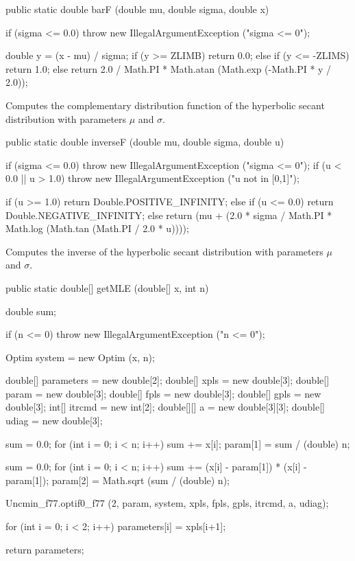 \begin{code}

   public static double barF (double mu, double sigma, double x)\begin{hide} {
      if (sigma <= 0.0)
         throw new IllegalArgumentException ("sigma <= 0");

      double y = (x - mu) / sigma;
      if (y >= ZLIMB)
         return 0.0;
      else if (y <= -ZLIMS)
      	 return 1.0;
      else
         return 2.0 / Math.PI * Math.atan (Math.exp (-Math.PI * y / 2.0));
   }\end{hide}
\end{code}
\begin{tabb}
   Computes the complementary distribution function of the
   hyperbolic secant distribution with parameters $\mu$ and $\sigma$.
 \end{tabb}
\begin{code}

   public static double inverseF (double mu, double sigma, double u)\begin{hide} {
      if (sigma <= 0.0)
         throw new IllegalArgumentException ("sigma <= 0");
      if (u < 0.0 || u > 1.0)
         throw new IllegalArgumentException ("u not in [0,1]");

      if (u >= 1.0)
         return Double.POSITIVE_INFINITY;
      else if (u <= 0.0)
         return Double.NEGATIVE_INFINITY;
      else
         return (mu + (2.0 * sigma / Math.PI * Math.log (Math.tan (Math.PI / 2.0 * u))));
   }\end{hide}
\end{code}
\begin{tabb}
   Computes the inverse of the hyperbolic secant distribution
   with parameters $\mu$ and $\sigma$.
 \end{tabb}
\begin{code}

   public static double[] getMLE (double[] x, int n)\begin{hide} {
      double sum;

      if (n <= 0)
         throw new IllegalArgumentException ("n <= 0");

      Optim system = new Optim (x, n);

      double[] parameters = new double[2];
      double[] xpls = new double[3];
      double[] param = new double[3];
      double[] fpls = new double[3];
      double[] gpls = new double[3];
      int[] itrcmd = new int[2];
      double[][] a = new double[3][3];
      double[] udiag = new double[3];

      sum = 0.0;
      for (int i = 0; i < n; i++)
         sum += x[i];
      param[1] = sum / (double) n;

      sum = 0.0;
      for (int i = 0; i < n; i++)
         sum += (x[i] - param[1]) * (x[i] - param[1]);
      param[2] = Math.sqrt (sum / (double) n);

      Uncmin_f77.optif0_f77 (2, param, system, xpls, fpls, gpls, itrcmd, a, udiag);

      for (int i = 0; i < 2; i++)
         parameters[i] = xpls[i+1];

      return parameters;
   }\end{hide}
\end{code}
